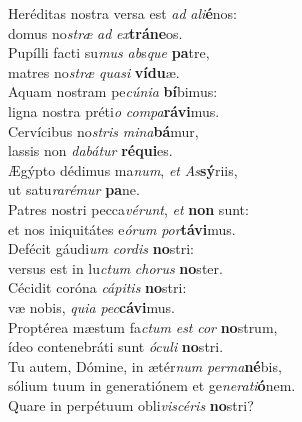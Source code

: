 \evenverse Heréditas nostra versa est \textit{ad} \textit{a}\textit{li}\textbf{é}nos:~\*\\
\evenverse domus no\textit{stræ} \textit{ad} \textit{ex}\textbf{trá}\textbf{ne}os.\\
\oddverse Pupílli facti su\textit{mus} \textit{ab}s\textit{que} \textbf{pa}tre,~\*\\
\oddverse matres no\textit{stræ} \textit{qua}\textit{si} \textbf{ví}\textbf{du}æ.\\
\evenverse Aquam nostram pe\textit{cú}\textit{ni}\textit{a} \textbf{bí}bimus:~\*\\
\evenverse ligna nostra préti\textit{o} \textit{com}\textit{pa}\textbf{rá}\textbf{vi}mus.\\
\oddverse Cervícibus no\textit{stris} \textit{mi}\textit{na}\textbf{bá}mur,~\*\\
\oddverse lassis non \textit{da}\textit{bá}\textit{tur} \textbf{ré}\textbf{qui}es.\\
\evenverse Ægýpto dédimus ma\textit{num}, \textit{et} \textit{As}\textbf{sý}riis,~\*\\
\evenverse ut satu\textit{ra}\textit{ré}\textit{mur} \textbf{pa}ne.\\
\oddverse Patres nostri pecca\textit{vé}\textit{runt}, \textit{et} \textbf{non} sunt:~\*\\
\oddverse et nos iniquitátes e\textit{ó}\textit{rum} \textit{por}\textbf{tá}\textbf{vi}mus.\\
\evenverse Defécit gáudi\textit{um} \textit{cor}\textit{dis} \textbf{no}stri:~\*\\
\evenverse versus est in lu\textit{ctum} \textit{cho}\textit{rus} \textbf{no}ster.\\
\oddverse Cécidit coróna \textit{cá}\textit{pi}\textit{tis} \textbf{no}stri:~\*\\
\oddverse væ nobis, \textit{qui}\textit{a} \textit{pec}\textbf{cá}\textbf{vi}mus.\\
\evenverse Proptérea mæstum fa\textit{ctum} \textit{est} \textit{cor} \textbf{no}strum,~\*\\
\evenverse ídeo contenebráti sunt \textit{ó}\textit{cu}\textit{li} \textbf{no}stri.\\
\oddverse Tu autem, Dómine, in ætér\textit{num} \textit{per}\textit{ma}\textbf{né}bis,~\*\\
\oddverse sólium tuum in generatiónem et ge\textit{ne}\textit{ra}\textit{ti}\textbf{ó}nem.\\
\evenverse Quare in perpétuum obli\textit{vi}\textit{scé}\textit{ris} \textbf{no}stri?~\*\\
